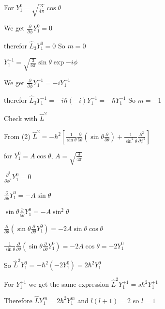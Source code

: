 \documentclass[11pt,a4paper]{scrartcl}
\begin{document}
\begin{enumerate}
\begin{calculationbox}
                    \begin{calculationbox}
                        For $Y_1^0 = \sqrt{\frac{3}{4\pi}} \cos\theta$ 
                        
                        We get $\frac{\partial}{\partial \phi} Y_1^0 = 0$

                        therefor $\hat{L}_3 Y_1^0 = 0$ So $m = 0$

                    \end{calculationbox}

                    \begin{calculationbox}
                        $Y_1^{-1} = \sqrt{\frac{3}{8\pi}} \sin\theta \exp{-i\phi}$
                        
                        We get $\frac{\partial}{\partial \phi} Y_1^{-1} = -i Y_1^{-1}$

                        therefor $\hat{L}_3 Y_1^{-1} = -i \hbar (-i) Y_1^{-1} = -\hbar Y_1^{-1}$ So $m = -1$

                    \end{calculationbox}

                    Check with $\hat{L}^2$
                    \begin{calculationbox}

                        From (2) $\hat{L}^2 = -\hbar^2 [\frac{1}{\sin\theta}\frac{\partial}{\partial \theta}(\sin\theta \frac{\partial}{\partial \theta}) + \frac{1}{\sin^2 \theta}\frac{\partial^2}{\partial\phi^2}]$

                        for $Y_1^0 = A \cos\theta$, $A =\sqrt{\frac{3}{4\pi}}$

                        $\frac{\partial^2}{\partial \phi^2} Y_1^0 = 0$

                        $\frac{\partial}{\partial \theta} Y_1^0 = -A \sin\theta$
                        
                        $\sin\theta \frac{\partial}{\partial \theta} Y_1^0 = -A \sin^2\theta$

                        $\frac{\partial}{\partial \theta} (\sin\theta \frac{\partial}{\partial \theta} Y_1^0) = -2 A \sin\theta \cos\theta$

                        $\frac{1}{\sin\theta}\frac{\partial}{\partial \theta} (\sin\theta \frac{\partial}{\partial \theta} Y_1^0) = -2 A \cos\theta = -2 Y_1^0$

                        So $\hat{L}^2 Y_1^0 = -\hbar^2 (-2 Y_1^0) = 2 \hbar^2 Y_1^0$

                        For $Y_1^{\pm1}$ we get the same expression $\hat{L}^2 Y_1^{\pm1} = s\hbar^2 Y_1^{\pm1}$

                        Therefore $\hat{L} Y_1^m = 2 \hbar^2 Y_1^m$ and $l (l+1) = 2$ so $l = 1$
                    \end{calculationbox}

                \end{calculationbox}

        \end{enumerate}
\end{document}
